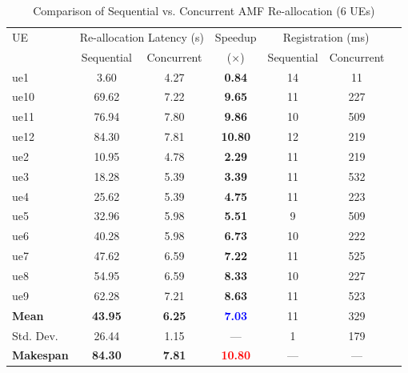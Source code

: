 \begin{table}[ht]
\centering
\caption{Comparison of Sequential vs. Concurrent AMF Re-allocation (6 UEs)}
\label{tab:comparison}
\begin{tabular}{|l|c|c|c|c|c|c|}
\hline
UE & \multicolumn{2}{c|}{Re-allocation Latency (s)} & Speedup & \multicolumn{2}{c|}{Registration (ms)} \\
     & Sequential & Concurrent & ($\times$) & Sequential & Concurrent \\
\hline
ue1 & 3.60 & 4.27 & \textbf{0.84} & 14 & 11 \\
ue10 & 69.62 & 7.22 & \textbf{9.65} & 11 & 227 \\
ue11 & 76.94 & 7.80 & \textbf{9.86} & 10 & 509 \\
ue12 & 84.30 & 7.81 & \textbf{10.80} & 12 & 219 \\
ue2 & 10.95 & 4.78 & \textbf{2.29} & 11 & 219 \\
ue3 & 18.28 & 5.39 & \textbf{3.39} & 11 & 532 \\
ue4 & 25.62 & 5.39 & \textbf{4.75} & 11 & 223 \\
ue5 & 32.96 & 5.98 & \textbf{5.51} & 9 & 509 \\
ue6 & 40.28 & 5.98 & \textbf{6.73} & 10 & 222 \\
ue7 & 47.62 & 6.59 & \textbf{7.22} & 11 & 525 \\
ue8 & 54.95 & 6.59 & \textbf{8.33} & 10 & 227 \\
ue9 & 62.28 & 7.21 & \textbf{8.63} & 11 & 523 \\
\hline
\textbf{Mean} & \textbf{43.95} & \textbf{6.25} & \textbf{\textcolor{blue}{7.03}} & 11 & 329 \\
Std. Dev. & 26.44 & 1.15 & — & 1 & 179 \\
\textbf{Makespan} & \textbf{84.30} & \textbf{7.81} & \textbf{\textcolor{red}{10.80}} & — & — \\
\hline
\end{tabular}
\end{table}
